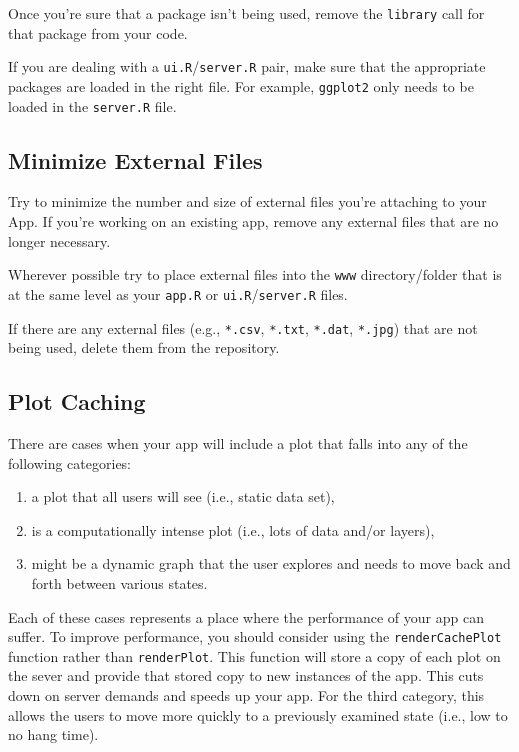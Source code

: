 \documentclass[
]{book}
\providecommand{\tightlist}{%
  \setlength{\itemsep}{0pt}\setlength{\parskip}{0pt}}
\begin{document}
Once you're sure that a package isn't being used, remove the \texttt{library} call for that package from your code.

If you are dealing with a \texttt{ui.R}/\texttt{server.R} pair, make sure that the appropriate packages are loaded in the right file. For example, \texttt{ggplot2} only needs to be loaded in the \texttt{server.R} file.

\hypertarget{exFiles}{%
\subsection{Minimize External Files}\label{exFiles}}

Try to minimize the number and size of external files you're attaching to your App. If you're working on an existing app, remove any external files that are no longer necessary.

Wherever possible try to place external files into the \texttt{www} directory/folder that is at the same level as your \texttt{app.R} or \texttt{ui.R}/\texttt{server.R} files.

If there are any external files (e.g., \texttt{*.csv}, \texttt{*.txt}, \texttt{*.dat}, \texttt{*.jpg}) that are not being used, delete them from the repository.

\hypertarget{plotCache}{%
\subsection{Plot Caching}\label{plotCache}}

There are cases when your app will include a plot that falls into any of the following categories:

\begin{enumerate}
\def\labelenumi{\arabic{enumi})}
\tightlist
\item
  a plot that all users will see (i.e., static data set),
\item
  is a computationally intense plot (i.e., lots of data and/or layers),
\item
  might be a dynamic graph that the user explores and needs to move back and forth between various states.
\end{enumerate}

Each of these cases represents a place where the performance of your app can suffer. To improve performance, you should consider using the \texttt{renderCachePlot} function rather than \texttt{renderPlot}. This function will store a copy of each plot on the sever and provide that stored copy to new instances of the app. This cuts down on server demands and speeds up your app. For the third category, this allows the users to move more quickly to a previously examined state (i.e., low to no hang time).
\end{document}
